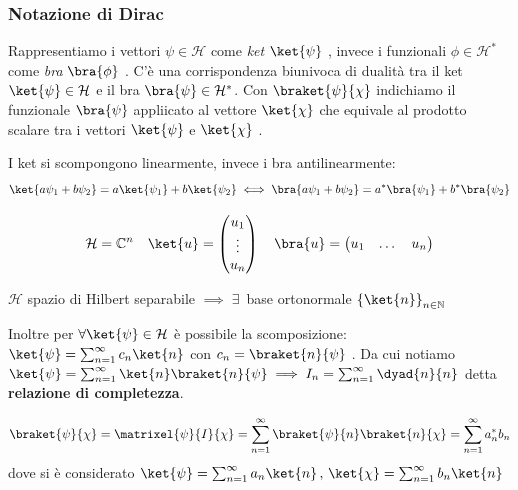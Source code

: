 \subsubsection{Notazione di Dirac}
Rappresentiamo i vettori \(\psi \in \mathcal{H}\) come \textit{ket} \(\ket{\psi}\) , 
invece i funzionali \(\phi\in \mathcal{H}^*\) come \textit{bra} \(\bra{\phi}\) .
C'è una corrispondenza biunivoca di dualità tra il ket \(\ket{\psi}\in \mathcal{H}\) e il bra \(\bra{\psi} \in \mathcal{H}^*\).
Con \(\braket{\psi}{\chi}\) indichiamo il funzionale \(\bra{\psi}\) appliicato al vettore \(\ket{\chi}\)
che equivale al prodotto scalare tra i vettori \(\ket{\psi}\) e \(\ket{\chi}\) .
\begin{attention}
    I ket si scompongono linearmente, invece i bra antilinearmente:
    \[
    \ket{a\psi_1+b\psi_2}= a\ket{\psi_1}+ b\ket{\psi_2} \iff \bra{a\psi_1+b\psi_2}= a^*\bra{\psi_1}+ b^* \bra{\psi_2}
    \]
\end{attention}

\begin{example}
    \[
    \mathcal{H}= \mathbb{C}^n   \quad \ket{u}= \begin{pmatrix}
        u_1\\\vdots \\ u_n  
    \end{pmatrix}
    \quad \bra{u}= \begin{pmatrix}
        u_1 & \dots & u_n
    \end{pmatrix}
    \]
\end{example}



\begin{theorem}
    \(\mathcal{H} \) spazio di Hilbert separabile \(\implies  \;\exists\,\) base ortonormale
    \(\left\{ \ket{n} \right\}_{n \in \mathbb{N}}\)
\end{theorem}
Inoltre per \(\forall \ket{\psi} \in \mathcal{H}\) è possibile la scomposizione:
\(\ket{\psi}= \sum_{n=1}^{\infty}c_n\ket{n}\) con \(c_n = \braket{n}{\psi}\) .
Da cui notiamo \(\ket{\psi}= \sum_{n=1}^{\infty}\ket{n}\braket{n}{\psi} \implies I_n= \sum_{n=1}^{\infty} \dyad{n}{n}\)
detta \textbf{relazione di completezza}.

\begin{example}
    \[
    \braket{\psi}{\chi}= \matrixel{\psi}{I}{\chi}=
    \sum_{n=1}^{\infty} \braket{\psi}{n}\braket{n}{\chi}  = \sum_{n=1}^{\infty} a^*_n b_n
    \]
    dove si è considerato \(\ket{\psi}= \sum_{n=1}^{\infty}a_n \ket{n} \,, 
    \, \ket{\chi}= \sum_{n=1}^{\infty}b_n \ket{n}\)
\end{example}

